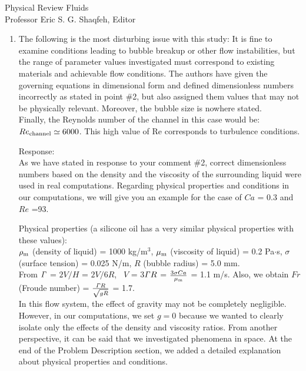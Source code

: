 \documentclass{letter}
\begin{document}
\begin{letter}{
Physical Review Fluids\\
Professor Eric S. G. Shaqfeh, Editor\\}
\begin{enumerate}
\par\noindent
\item
\textsf
{The following is the most disturbing issue with this study: It is fine to
examine conditions leading to bubble breakup or other flow instabilities, but
the range of parameter values investigated must correspond to existing
materials and achievable flow conditions.  The authors have given the governing
equations in dimensional form and defined dimensionless numbers incorrectly as
stated in point \#2, but also assigned them values that may not be physically
relevant. Moreover, the bubble size is nowhere stated.  \\
Finally, the Reynolds number of the channel in this case would be: $Re_{\rm
channel} \simeq 6000$.  This high value of Re corresponds to turbulence
conditions.}
\vspace{3 mm}

Response: \\
As we have stated in response to your comment \#2, correct dimensionless
numbers based on the density and the viscosity of the surrounding liquid were
used in real computations.  Regarding physical properties and conditions in our
computations, we will give you an example for the case of $Ca$ = 0.3 and $Re$
=93.\\
\par\noindent
Physical properties 
(a silicone oil has a very similar physical properties with these values):\\
\quad $\rho_{\rm m}$ (density of liquid) = 1000 kg/m$^3$, 
$\mu_{\rm m}$ (viscosity of liquid) = 0.2 Pa$\cdot$s,
$\sigma$ (surface tension) = 0.025 N/m, $R$ (bubble radius) = 5.0 mm.\\
From ${\it \Gamma}$ = $2V/H$ = $2V/6R$, \  
$V$ = 3${\it \Gamma} R$ = $\frac{3\sigma Ca}{\mu_{\rm m}} $ = 1.1 m/s.
Also, we obtain $Fr$ (Froude number) = 
$\frac{{\it \Gamma}R}{\sqrt {gR}}$ = 1.7. \\
In this flow system, the effect of gravity may not be completely 
negligible. However, in our computations, 
we set $g = 0$ because we wanted to clearly isolate only the effects of 
the density and viscosity ratios. 
From another perspective, it can be said that we investigated 
phenomena in space.
At the end of the Problem Description section, 
we added a detailed explanation about physical properties and conditions.


\end{enumerate}
\end{letter}
\end{document}
